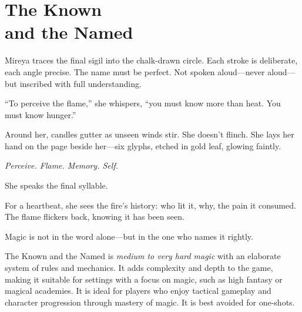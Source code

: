 \section[The Known and the Named]{The Known\\ and the Named}

\begin{Example}{}
    Mireya traces the final sigil into the chalk-drawn circle. Each stroke is deliberate, each angle precise. The name must be perfect. Not spoken aloud—never aloud—but inscribed with full understanding.

    “To perceive the flame,” she whispers, “you must know more than heat. You must know hunger.”

    Around her, candles gutter as unseen winds stir. She doesn’t flinch. She lays her hand on the page beside her—six glyphs, etched in gold leaf, glowing faintly.

    \textit{Perceive. Flame. Memory. Self.} 

    She speaks the final syllable.

    For a heartbeat, she sees the fire’s history: who lit it, why, the pain it consumed. The flame flickers back, knowing it has been seen.

    Magic is not in the word alone—but in the one who names it rightly.
\end{Example}

The Known and the Named is \emph{medium to very hard magic} with an elaborate system of rules and mechanics. It adds complexity and depth to the game, making it suitable for settings with a focus on magic, such as high fantasy or magical academies. It is ideal for players who enjoy tactical gameplay and character progression through mastery of magic. It is best avoided for one-shots.
